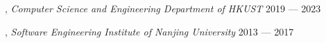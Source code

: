 
, \textit{Computer Science and Engineering Department of HKUST}	\hfill 2019 --- 2023

, \textit{Software Engineering Institute of Nanjing University } \hfill    2013 --- 2017




